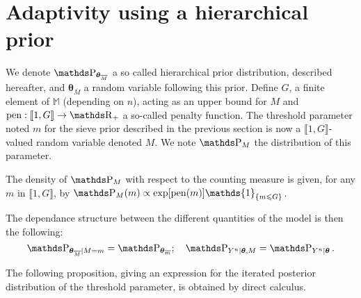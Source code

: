 \section{Adaptivity using a hierarchical prior}\label{BAYES_HIERARCHICAL}

We denote $\P_{\boldsymbol{\theta}_{\overline{M}}}$ a so called hierarchical prior distribution, described hereafter, and $\boldsymbol{\theta}_{\overline{M}}$ a random variable following this prior.
Define $G$, a finite element of $\mathds{M}$ (depending on $n$), acting as an upper bound for $M$ and $\pen: \llbracket 1, G \rrbracket \rightarrow \R_{+}$ a so-called penalty function.
The threshold parameter noted $m$ for the sieve prior described in the previous section is now a $\llbracket 1, G \rrbracket$-valued random variable denoted $M$. We note $\P_{M}$ the distribution of this parameter.

The density of $\P_{M}$ with respect to the counting measure is given, for any $m$ in $\llbracket 1, G \rrbracket$, by $\P_{M}(m) \propto \exp[\pen(m)] \mathds{1}_{\{ m \leq G \}}$.

The dependance structure between the different quantities of the model is then the following:
\[ \P_{\boldsymbol{\theta}_{\overline{M}} \vert M=m} = \P_{\boldsymbol{\theta}_{\overline{m}}};\quad \P_{Y^{n} \vert \boldsymbol{\theta}, M} = \P_{Y^{n} \vert \boldsymbol{\theta}}.\]

The following proposition, giving an expression for the iterated posterior distribution of the threshold parameter, is obtained by direct calculus.

